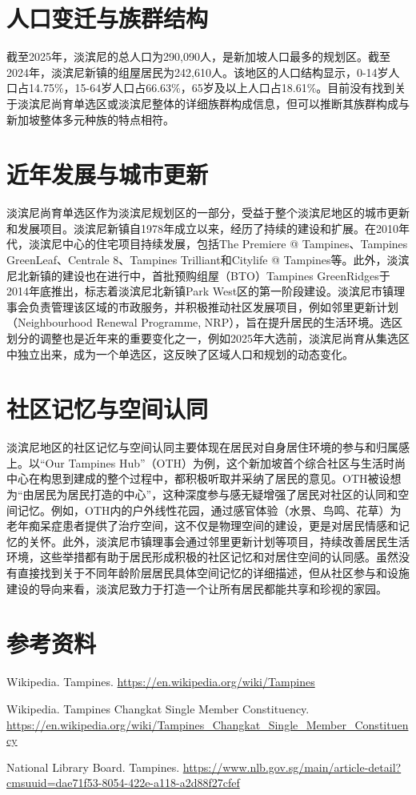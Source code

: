 \documentclass[11pt,a4paper,twoside,openany]{book}
\begin{document}
\section{人口变迁与族群结构}
截至2025年，淡滨尼的总人口为290,090人，是新加坡人口最多的规划区。截至2024年，淡滨尼新镇的组屋居民为242,610人。该地区的人口结构显示，0-14岁人口占14.75\%，15-64岁人口占66.63\%，65岁及以上人口占18.61\%。目前没有找到关于淡滨尼尚育单选区或淡滨尼整体的详细族群构成信息，但可以推断其族群构成与新加坡整体多元种族的特点相符。

\section{近年发展与城市更新}
淡滨尼尚育单选区作为淡滨尼规划区的一部分，受益于整个淡滨尼地区的城市更新和发展项目。淡滨尼新镇自1978年成立以来，经历了持续的建设和扩展。在2010年代，淡滨尼中心的住宅项目持续发展，包括The Premiere @ Tampines、Tampines GreenLeaf、Centrale 8、Tampines Trilliant和Citylife @ Tampines等。此外，淡滨尼北新镇的建设也在进行中，首批预购组屋（BTO）Tampines GreenRidges于2014年底推出，标志着淡滨尼北新镇Park West区的第一阶段建设。淡滨尼市镇理事会负责管理该区域的市政服务，并积极推动社区发展项目，例如邻里更新计划（Neighbourhood Renewal Programme, NRP），旨在提升居民的生活环境。选区划分的调整也是近年来的重要变化之一，例如2025年大选前，淡滨尼尚育从集选区中独立出来，成为一个单选区，这反映了区域人口和规划的动态变化。

\section{社区记忆与空间认同}
淡滨尼地区的社区记忆与空间认同主要体现在居民对自身居住环境的参与和归属感上。以“Our Tampines Hub”（OTH）为例，这个新加坡首个综合社区与生活时尚中心在构思到建成的整个过程中，都积极听取并采纳了居民的意见。OTH被设想为“由居民为居民打造的中心”，这种深度参与感无疑增强了居民对社区的认同和空间记忆。例如，OTH内的户外线性花园，通过感官体验（水景、鸟鸣、花草）为老年痴呆症患者提供了治疗空间，这不仅是物理空间的建设，更是对居民情感和记忆的关怀。此外，淡滨尼市镇理事会通过邻里更新计划等项目，持续改善居民生活环境，这些举措都有助于居民形成积极的社区记忆和对居住空间的认同感。虽然没有直接找到关于不同年龄阶层居民具体空间记忆的详细描述，但从社区参与和设施建设的导向来看，淡滨尼致力于打造一个让所有居民都能共享和珍视的家园。

\section*{参考资料}
\begin{enumerate}[label={[\arabic*]},leftmargin=*,topsep=2pt,itemsep=1pt,parsep=0pt]
  \item Wikipedia. Tampines. \url{https://en.wikipedia.org/wiki/Tampines}
  \item Wikipedia. Tampines Changkat Single Member Constituency. \url{https://en.wikipedia.org/wiki/Tampines_Changkat_Single_Member_Constituency}
  \item National Library Board. Tampines. \url{https://www.nlb.gov.sg/main/article-detail?cmsuuid=dae71f53-8054-422e-a118-a2d88f27cfef}
\end{enumerate}
\end{document}
